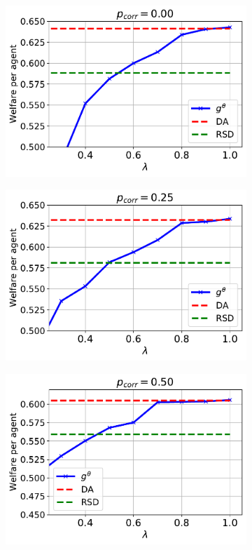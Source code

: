 \documentclass[11pt,letterpaper]{article}
\theoremstyle{definition}
\newcommand{\kibitz}[2]{\ifnum\Comments=1{\color{#1}{#2}}\fi}
\newcommand{\dcp}[1]{\kibitz{orange}{[DCP: #1]}}
\begin{document}
%
%
\begin{figure}
\centering
\begin{subfigure}[b]{0.49\textwidth}
\centering
\includegraphics[scale=0.5]{plots/wf_corr_0.00.pdf}
\end{subfigure}
\begin{subfigure}[b]{0.49\textwidth}
\centering
\includegraphics[scale=0.5]{plots/wf_corr_0.25.pdf}
\end{subfigure}
\begin{subfigure}[b]{0.49\textwidth}
\centering
\includegraphics[scale=0.5]{plots/wf_corr_0.50.pdf}

\end{subfigure}
\end{figure}
\end{document}
